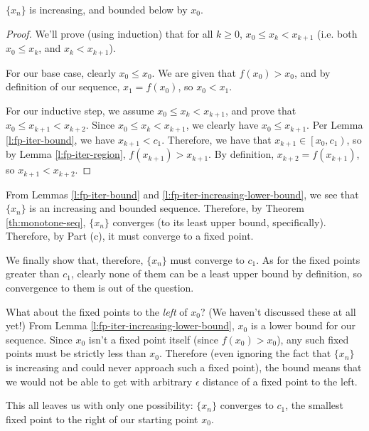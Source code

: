 \begin{lemma}
\label{l:fp-iter-increasing-lower-bound}
$\{x_n\}$ is increasing, and bounded below by $x_0$. 
\end{lemma}
\begin{proof}
We'll prove (using induction) that for all $k \geq 0$, $x_0 \leq x_k < x_{k+1}$ (i.e. both $x_0 \leq x_k$, and $x_k < x_{k+1}$). 

For our base case, clearly $x_0 \leq x_0$. We are given that $f(x_0) > x_0$, and by definition of our sequence, $x_1 = f(x_0)$, so $x_0 < x_1$.

For our inductive step, we assume $x_0 \leq x_k < x_{k+1}$, and prove that $x_0 \leq x_{k+1} < x_{k+2}$. Since $x_0 \leq x_k < x_{k+1}$, we clearly have $x_0 \leq x_{k+1}$. Per Lemma \ref{l:fp-iter-bound}, we have $x_{k+1} < c_1$. Therefore, we have that $x_{k+1} \in \left[x_0, c_1\right)$, so by Lemma \ref{l:fp-iter-region}, $f(x_{k+1}) > x_{k+1}$. By definition, $x_{k+2} = f(x_{k+1})$, so $x_{k+1} < x_{k+2}$. 

\end{proof}

From Lemmas \ref{l:fp-iter-bound} and \ref{l:fp-iter-increasing-lower-bound}, we see that $\{x_n\}$ is an increasing and bounded sequence. Therefore, by Theorem \ref{th:monotone-seq}, $\{x_n\}$ converges (to its least upper bound, specifically). Therefore, by Part (c), it must converge to a fixed point.

We finally show that, therefore, $\{x_n\}$ must converge to $c_1$. As for the fixed points greater than $c_1$, clearly none of them can be a least upper bound by definition, so convergence to them is out of the question.

What about the fixed points to the \emph{left} of $x_0$? (We haven't discussed these at all yet!) From Lemma \ref{l:fp-iter-increasing-lower-bound}, $x_0$ is a lower bound for our sequence. Since $x_0$ isn't a fixed point itself (since $f(x_0) > x_0$), any such fixed points must be strictly less than $x_0$. Therefore (even ignoring the fact that $\{x_n\}$ is increasing and could never approach such a fixed point), the bound means that we would not be able to get with arbitrary $\epsilon$ distance of a fixed point to the left.

This all leaves us with only one possibility: $\{x_n\}$ converges to $c_1$, the smallest fixed point to the right of our starting point $x_0$.

